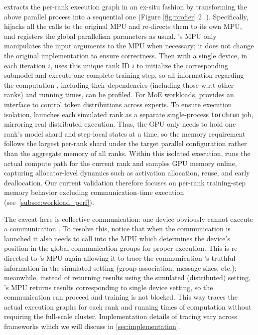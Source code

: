 \sys extracts the per-rank execution graph in an ex-situ fashion by transforming the above parallel process into a sequential one (Figure \ref{fig:profier} \textcircled{2}
). 
Specifically, \sys hijacks all the calls to the original MPU and re-directs them to its own MPU, and registers the global parallelism parameters as usual.
\sys's MPU only manipulates the input arguments to the MPU when necessary; it does not change the original implementation to ensure correctness.
Then with a single device, in each iteration $i$, \sys uses this unique rank ID $i$ to initialize the corresponding submodel and execute one complete training step, so all information regarding the computation \ops, including their dependencies (including those w.r.t other ranks) and running times, can be profiled.
For MoE workloads, \sys provides an interface to control token distributions across experts.
To ensure execution isolation, \sys launches each simulated rank as a separate single-process \texttt{torchrun} job, mirroring real distributed execution. Thus, the GPU only needs to hold one rank's model shard and step-local states at a time, so the memory requirement follows the largest per-rank shard under the target parallel configuration rather than the aggregate memory of all ranks.
Within this isolated execution, \sys runs the actual compute path for the current rank and samples GPU memory online, capturing allocator-level dynamics such as activation allocation, reuse, and early deallocation. Our current validation therefore focuses on per-rank training-step memory behavior excluding communication-time execution (see~\cref{subsec:workload_perf}).


The caveat here is collective communication: one device obviously cannot execute a communication \op. 
To resolve this, notice that when the communication \op is launched it also needs to call into the MPU which determines the device's position in the global communication groups for proper execution.
This is re-directed to \sys's MPU again allowing it to trace the communication \op's truthful information in the simulated setting (group association, message sizes, etc.); meanwhile, instead of returning results using the simulated (distributed) setting, \sys's MPU returns results corresponding to single device setting, so the communication \op can proceed and training is not blocked. 
This way \sys traces the actual execution graphs for each rank and running times of computation \ops without requiring the full-scale cluster.
Implementation details of tracing vary across frameworks which we will discuss in \cref{sec:implementation}.

